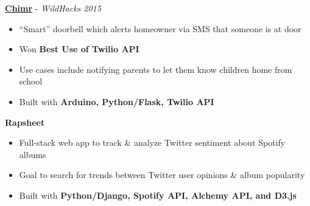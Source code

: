 \documentclass[10pt,a4paper,sans]{moderncv}        %
\begin{document}
\vspace{3pt}
\textbf{\href{http://devpost.com/software/chimr}{Chimr}} - \textit{WildHacks 2015}
\begin{itemize}
  \item ``Smart'' doorbell which alerts homeowner via SMS that someone is at door
  \item Won \textbf{Best Use of Twilio API}
  \item Use cases include notifying parents to let them know children home from school
  \item Built with \textbf{Arduino, Python/Flask, Twilio API}
\end{itemize}

\vspace{3pt}
\textbf{Rapsheet}
\begin{itemize}
  \item Full-stack web app to track \& analyze Twitter sentiment about Spotify albums
  \item Goal to search for trends between Twitter user opinions \& album popularity
  \item Built with \textbf{Python/Django, Spotify API, Alchemy API, and D3.js}
\end{itemize}


%
%
%
%
%
%
%
%
\end{document}
